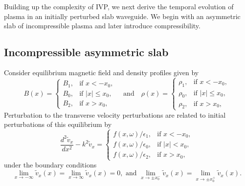 \documentclass[12pt]{../style-files/ociamthesis}
\begin{document}
Building up the complexity of IVP, we next derive the temporal evolution of plasma in an initially perturbed slab waveguide. We begin with an asymmetric slab of incompressible plasma and later introduce compressibility.

\subsection{Incompressible asymmetric slab}

Consider equilibrium magnetic field and density profiles given by
\begin{equation}
B(x)=
\begin{cases}
B_1, & \text{if  }x<-x_0, \\
B_0, & \text{if }|x|\leq{x_0}, \\
B_2, & \text{if  }x>x_0,
\end{cases}
\quad \text{and} \quad
\rho(x)=
\begin{cases}
\rho_1, & \text{if  }x<-x_0, \\
\rho_0, & \text{if }|x|\leq{x_0}, \\
\rho_2, & \text{if  }x>x_0,
\end{cases}
\end{equation}
Perturbation to the transverse velocity perturbations are related to initial perturbations of this equilibrium by
\begin{equation}
\frac{d^2\tilde{v}_x}{dx^2} - k^2\tilde{v}_x = 
\begin{cases}
f(x, \omega)/\epsilon_1, & \text{if  } x<-x_0,\\
f(x, \omega)/\epsilon_0, & \text{if  } |x|<x_0,\\
f(x, \omega)/\epsilon_2, & \text{if  } x>x_0,
\end{cases}
\label{ivp gov slab 2}
\end{equation}
under the boundary conditions
\begin{equation}
\lim_{x \to -\infty}\tilde{v}_x(x) = \lim_{x \to \infty}\tilde{v}_x(x) = 0, \text{ and } \lim_{x \to \pm x_0^-}\tilde{v}_x(x) = \lim_{x \to \pm x_0^+}\tilde{v}_x(x).
\label{ivp slab BC}
\end{equation}
\end{document}
